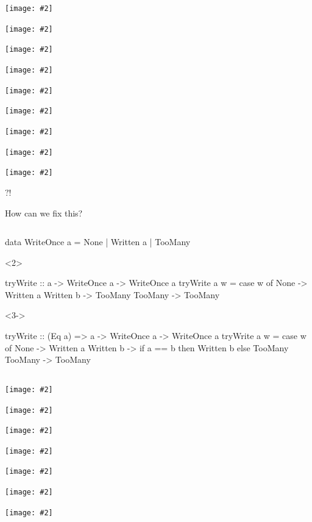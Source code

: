 \documentclass[UKenglish,usenames,dvipsnames,svgnames,table,aspectratio=169,mathserif]{beamer}
\newcommand{\nl}{\vspace{\baselineskip}}
\newcommand{\imageslide}[2][1]{{
\begin{frame}\begin{center}
\texttt{[image: \#2]}
\end{center}\end{frame}
}}
\begin{document}
\imageslide{oscillator0.pdf}
\imageslide{oscillator1.pdf}
\imageslide{oscillator2.pdf}
\imageslide{oscillator3.pdf}
\imageslide{oscillator4.pdf}
\imageslide{oscillator5.pdf}
\imageslide{oscillator6.pdf}
\imageslide{oscillator7.pdf}
\imageslide{oscillator8.pdf}


\begin{frame}
\centering
\fontsize{60}{70}\selectfont $?!$

\end{frame}


\begin{frame}
\centering \huge

How can we fix this?
\end{frame}


\begin{frame}[fragile]
\begin{columns}
\begin{overlayarea}{\textwidth}{0.6\textheight}
\begin{haskellcode}
data WriteOnce a
  = None
  | Written a
  | TooMany
\end{haskellcode}

\nl

\begin{onlyenv}<2>
\begin{haskellcode}
tryWrite ::           a -> WriteOnce a -> WriteOnce a
tryWrite a w = case w of
  None      -> Written a
  Written b -> TooMany
  TooMany   -> TooMany
\end{haskellcode}
\end{onlyenv}

\begin{onlyenv}<3->
\begin{haskellcode}
tryWrite :: (Eq a) => a -> WriteOnce a -> WriteOnce a
tryWrite a w = case w of
  None      -> Written a
  Written b -> if a == b then Written b else TooMany
  TooMany   -> TooMany
\end{haskellcode}
\end{onlyenv}
\end{overlayarea}
\end{columns}
\end{frame}


\imageslide{oscillator-fixed1.pdf}
\imageslide{oscillator-fixed2.pdf}
\imageslide{oscillator-fixed3.pdf}
\imageslide{oscillator-fixed4.pdf}
\imageslide{oscillator-fixed5.pdf}
\imageslide{oscillator-fixed6.pdf}
\imageslide{oscillator-fixed7.pdf}
\end{document}
